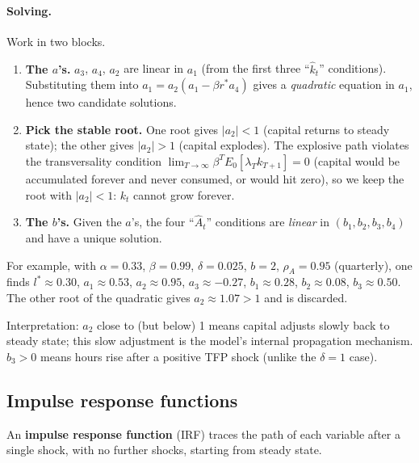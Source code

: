 \paragraph{Solving.} Work in two blocks.
\begin{enumerate}
  \item \textbf{The $a$'s.} $a_3$, $a_4$, $a_2$ are linear in $a_1$ (from the first three ``$\hat k_t$'' conditions). Substituting them into $a_1=a_2(a_1-\beta r^*a_4)$ gives a \emph{quadratic} equation in $a_1$, hence two candidate solutions.
  \item \textbf{Pick the stable root.} One root gives $|a_2|<1$ (capital returns to steady state); the other gives $|a_2|>1$ (capital explodes). The explosive path violates the transversality condition $\lim_{T\to\infty}\beta^TE_0[\lambda_Tk_{T+1}]=0$ (capital would be accumulated forever and never consumed, or would hit zero), so we keep the root with $|a_2|<1$: $k_t$ cannot grow forever.
  \item \textbf{The $b$'s.} Given the $a$'s, the four ``$\hat A_t$'' conditions are \emph{linear} in $(b_1,b_2,b_3,b_4)$ and have a unique solution.
\end{enumerate}
For example, with $\alpha=0.33$, $\beta=0.99$, $\delta=0.025$, $b=2$, $\rho_A=0.95$ (quarterly), one finds $l^*\approx0.30$, $a_1\approx0.53$, $a_2\approx0.95$, $a_3\approx-0.27$, $b_1\approx0.28$, $b_2\approx0.08$, $b_3\approx0.50$. The other root of the quadratic gives $a_2\approx1.07>1$ and is discarded.

Interpretation: $a_2$ close to (but below) 1 means capital adjusts slowly back to steady state; this slow adjustment is the model's internal propagation mechanism. $b_3>0$ means hours rise after a positive TFP shock (unlike the $\delta=1$ case).

\subsection{Impulse response functions }

An \textbf{impulse response function} (IRF) traces the path of each variable after a single shock, with no further shocks, starting from steady state.

